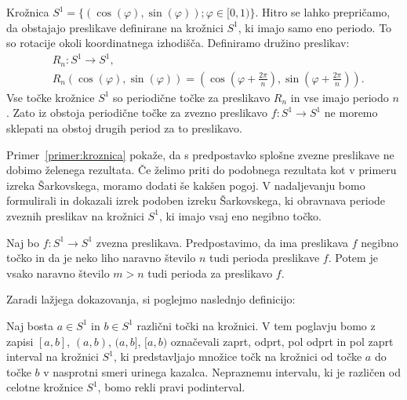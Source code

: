 \documentclass[../TG_magistrsko_delo_sections.tex]{subfiles}
\begin{document}
\begin{primer}\label{primer:kroznica}
Krožnica $S^1 = \{ (\cos(\varphi), \sin(\varphi)); \varphi \in [0, 1) \}$. Hitro se lahko prepričamo, da obstajajo preslikave definirane na krožnici $S^1$, ki imajo samo eno periodo. To so rotacije okoli koordinatnega izhodišča. Definiramo družino preslikav: 
\begin{equation*} %
\begin{split}
&R_n \colon S^1 \to S^1, \\ 
&R_n (\cos(\varphi), \sin(\varphi)) = (\cos(\varphi + \frac{2 \pi}{n}), \sin(\varphi + \frac{2 \pi}{n})).
\end{split}
\end{equation*}
Vse točke krožnice $S^1$ so periodične točke za preslikavo $R_n$ in vse imajo periodo $n$. Zato iz obstoja periodične točke za zvezno preslikavo $f \colon S^1 \to S^1$ ne moremo sklepati na obstoj drugih period za to preslikavo.
\end{primer}

Primer~\ref{primer:kroznica} pokaže, da s predpostavko splošne zvezne preslikave ne dobimo želenega rezultata. Če želimo priti do podobnega rezultata kot v primeru izreka Šarkovskega, moramo dodati še kakšen pogoj. V nadaljevanju bomo formulirali in dokazali izrek podoben izreku Šarkovskega, ki obravnava periode zveznih preslikav na krožnici $S^1$, ki imajo vsaj eno negibno točko.

\begin{izrek}\label{izr:sarkovski_kroznica}
Naj bo $f \colon S^1 \to S^1$ zvezna preslikava. Predpostavimo, da ima preslikava $f$ negibno točko in da je neko liho naravno število $n$ tudi perioda preslikave $f$. Potem je vsako naravno število $m > n$ tudi perioda za preslikavo $f$.
\end{izrek}

Zaradi lažjega dokazovanja, si poglejmo naslednjo definicijo:
\begin{definicija}\label{def:kintervali}
Naj bosta $a \in S^1$ in $b \in S^1$ različni točki na krožnici. V tem poglavju bomo z zapisi $[a, b]$, $(a, b)$, $(a, b]$, $[a, b)$ označevali zaprt, odprt, pol odprt in pol zaprt interval na krožnici $S^1$, ki predstavljajo množice točk na krožnici od točke $a$ do točke $b$ v nasprotni smeri urinega kazalca. Nepraznemu intervalu, ki je različen od celotne krožnice $S^1$, bomo rekli pravi podinterval.
\end{definicija}
\end{document}
